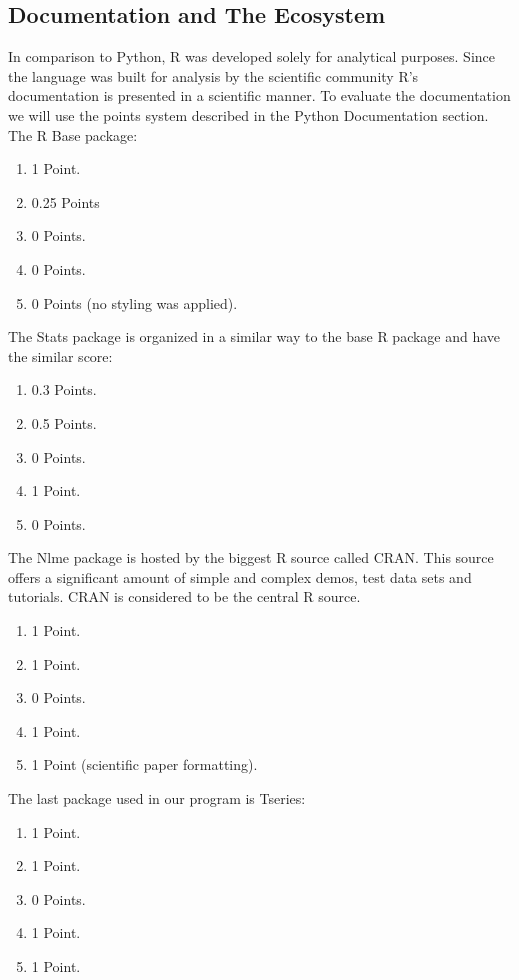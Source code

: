 \documentclass[
  twoside,
  11pt, a4paper,
  footinclude=true,
  headinclude=true,
  cleardoublepage=empty
]{scrreprt}
\begin{document}
    \subsection{Documentation and The Ecosystem}
    In comparison to Python, R was developed solely for analytical purposes. Since the language was built for analysis by the scientific community R's documentation is presented in a scientific manner. To evaluate the documentation we will use the points system described in the Python Documentation section.\\
    The R Base package:
    \begin{enumerate}
        \item 1 Point.
        \item 0.25 Points
        \item 0 Points.
        \item 0 Points.
        \item 0 Points (no styling was applied).
    \end{enumerate}
    The Stats package is organized in a similar way to the base R package and have the similar score:
    \begin{enumerate}
        \item 0.3 Points.
        \item 0.5 Points.
        \item 0 Points.
        \item 1 Point.
        \item 0 Points.
    \end{enumerate} 
    The Nlme package is hosted by the biggest R source called CRAN. This source offers a significant amount of simple and complex demos, test data sets and tutorials. CRAN is considered to be the central R source.
    \begin{enumerate}
        \item 1 Point.
        \item 1 Point.
        \item 0 Points.
        \item 1 Point.
        \item 1 Point (scientific paper formatting).
    \end{enumerate}
    The last package used in our program is Tseries:
    \begin{enumerate}
        \item 1 Point.
        \item 1 Point.
        \item 0 Points.
        \item 1 Point.
        \item 1 Point.
    \end{enumerate}
\end{document}
